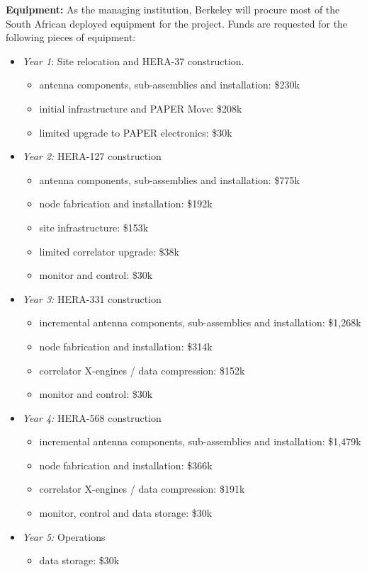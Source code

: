 \documentclass[onecolumn,11pt]{aastex}
\begin{document}
{\bf Equipment:}  As the managing institution, Berkeley will procure most of the South African deployed equipment for the project.  Funds are requested for the following pieces of equipment:
\begin{itemize}
\item {\em Year 1}:  Site relocation and HERA-37 construction.
\begin{itemize}
	\item antenna components, sub-assemblies and installation:  \$230k
	\item initial infrastructure and PAPER Move:  \$208k
	\item limited upgrade to PAPER electronics:  \$30k
\end{itemize}
\item {\em Year 2:}  HERA-127 construction
\begin{itemize}
	\item antenna components, sub-assemblies and installation:  \$775k
	\item node fabrication and installation:  \$192k
	\item site infrastructure:  \$153k
	\item limited correlator upgrade:  \$38k
	\item monitor and control:  \$30k
\end{itemize}
\item {\em Year 3:}  HERA-331 construction
\begin{itemize}
	\item incremental antenna components, sub-assemblies and installation:  \$1,268k
	\item node fabrication and installation:  \$314k
	\item correlator X-engines / data compression:  \$152k
	\item monitor and control:  \$30k
\end{itemize}
\item {\em Year 4:}  HERA-568 construction
\begin{itemize}
	\item incremental antenna components, sub-assemblies and installation:  \$1,479k
	\item node fabrication and installation:  \$366k
	\item correlator X-engines / data compression:  \$191k
	\item monitor, control and data storage:  \$30k
\end{itemize}
\item {\em Year 5:}  Operations
\begin{itemize}
	\item data storage:  \$30k
\end{itemize}

\end{itemize}
\end{document}
